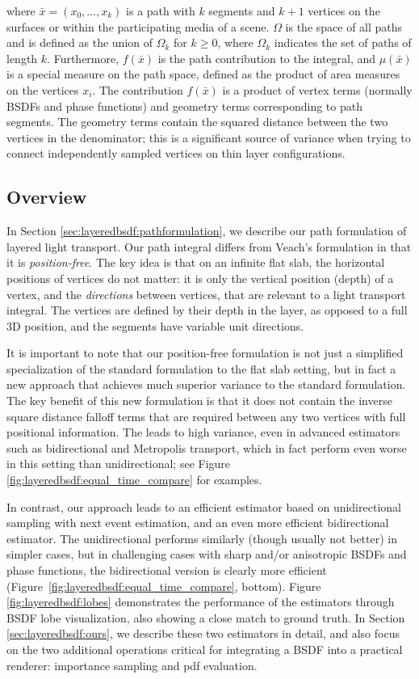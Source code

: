 where $\bar x = (x_0, \dots, x_k)$ is a path with $k$ segments and $k + 1$ vertices on the surfaces or within the participating media of a scene.
$\Omega$ is the space of all paths and is defined as the union of $\Omega_k$ for $k \geq 0$, where $\Omega_k$ indicates the set of paths of length $k$.
Furthermore, $f(\bar x)$ is the path contribution to the integral, and $\mu(\bar x)$ is a special measure on the path space, defined as the product of area measures on the vertices $x_i$. The contribution $f(\bar x)$ is a product of vertex terms (normally BSDFs and phase functions) and geometry terms corresponding to path segments. The geometry terms contain the squared distance between the two vertices in the denominator; this is a significant source of variance when trying to connect independently sampled vertices on thin layer configurations.

\subsection{Overview}

In Section \ref{sec:layeredbsdf:pathformulation}, we describe our path formulation of layered light transport. Our path integral differs from Veach's formulation in that it is \emph{position-free}. The key idea is that on an infinite flat slab, the horizontal positions of vertices do not matter: it is only the vertical position (depth) of a vertex, and the \emph{directions} between vertices, that are relevant to a light transport integral. The vertices are defined by their depth in the layer, as opposed to a full 3D position, and the segments have variable unit directions.

It is important to note that our position-free formulation is not just a simplified specialization of the standard formulation to the flat slab setting, but in fact a new approach that achieves much superior variance to the standard formulation. The key benefit of this new formulation is that it does not contain the inverse square distance falloff terms that are required between any two vertices with full positional information. The leads to high variance, even in advanced estimators such as bidirectional and Metropolis transport, which in fact perform even worse in this setting than unidirectional; see Figure \ref{fig:layeredbsdf:equal_time_compare} for examples.

In contrast, our approach leads to an efficient estimator based on unidirectional sampling with next event estimation, and an even more efficient bidirectional estimator. The unidirectional performs similarly (though usually not better) in simpler cases, but in challenging cases with sharp and/or anisotropic BSDFs and phase functions, the bidirectional version is clearly more efficient (Figure~\ref{fig:layeredbsdf:equal_time_compare}, bottom). 
Figure \ref{fig:layeredbsdf:lobes} demonstrates the performance of the estimators through BSDF lobe visualization, also showing a close match to ground truth. In Section \ref{sec:layeredbsdf:ours}, we describe these two estimators in detail, and also focus on the two additional operations critical for integrating a BSDF into a practical renderer: importance sampling and pdf evaluation.

